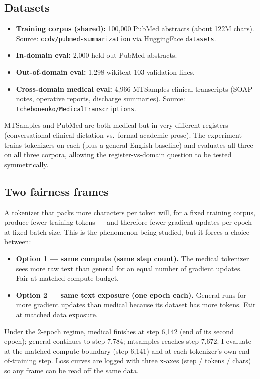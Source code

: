 \documentclass[11pt]{article}
\begin{document}
\subsection{Datasets}

\begin{itemize}[leftmargin=*, itemsep=0pt]
    \item \textbf{Training corpus (shared):} 100,000 PubMed abstracts (about 122M chars). Source: \texttt{ccdv/pubmed-summarization} via HuggingFace \texttt{datasets}.
    \item \textbf{In-domain eval:} 2,000 held-out PubMed abstracts.
    \item \textbf{Out-of-domain eval:} 1,298 wikitext-103 validation lines.
    \item \textbf{Cross-domain medical eval:} 4,966 MTSamples clinical transcripts (SOAP notes, operative reports, discharge summaries). Source: \texttt{tchebonenko/MedicalTranscriptions}.
\end{itemize}

MTSamples and PubMed are both medical but in very different registers (conversational clinical dictation vs.\ formal academic prose). The experiment trains tokenizers on each (plus a general-English baseline) and evaluates all three on all three corpora, allowing the register-vs-domain question to be tested symmetrically.

\subsection{Two fairness frames}

A tokenizer that packs more characters per token will, for a fixed training corpus, produce fewer training tokens --- and therefore fewer gradient updates per epoch at fixed batch size. This is the phenomenon being studied, but it forces a choice between:

\begin{itemize}[leftmargin=*, itemsep=0pt]
    \item \textbf{Option 1 --- same compute (same step count).} The medical tokenizer sees more raw text than general for an equal number of gradient updates. Fair at matched compute budget.
    \item \textbf{Option 2 --- same text exposure (one epoch each).} General runs for more gradient updates than medical because its dataset has more tokens. Fair at matched data exposure.
\end{itemize}

Under the 2-epoch regime, medical finishes at step 6,142 (end of its second epoch); general continues to step 7,784; mtsamples reaches step 7,672. I evaluate at the matched-compute boundary (step 6,141) and at each tokenizer's own end-of-training step. Loss curves are logged with three x-axes (step / tokens / chars) so any frame can be read off the same data.
\end{document}
